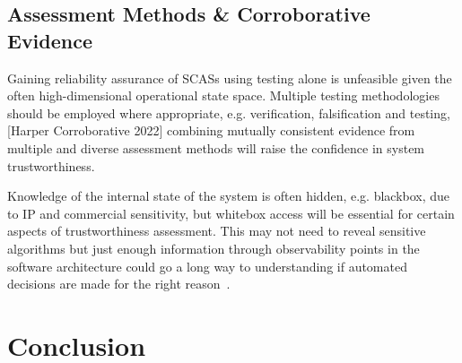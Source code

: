 
\subsection{Assessment Methods \& Corroborative Evidence}
Gaining reliability assurance of SCASs using testing alone is unfeasible given the often high-dimensional operational state space. Multiple testing methodologies should be employed where appropriate, e.g. verification, falsification and testing, [Harper Corroborative 2022] combining mutually consistent evidence from multiple and diverse assessment methods will raise the confidence in system trustworthiness.

Knowledge of the internal state of the system is often hidden, e.g. blackbox, due to IP and commercial sensitivity, but whitebox access will be essential for certain aspects of trustworthiness assessment. This may not need to reveal sensitive algorithms but just enough information through observability points in the software architecture could go a long way to understanding if automated decisions are made for the right reason~\cite{koopman2018toward}. 




\section{Conclusion}\label{conclusion}







% 

